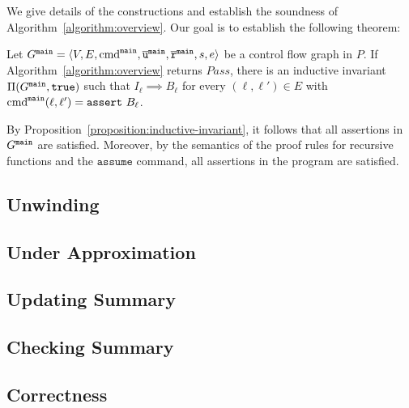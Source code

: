 
We give details of the constructions and establish the soundness of
Algorithm~\ref{algorithm:overview}. Our goal is to establish the
following theorem:

\begin{theorem}
  Let $G^{\mathtt{{main}}} = \langle V, E, \textmd{cmd}^{\mathtt{{main}}} , \overline{\mathtt{u}}^{\mathtt{{main}}}, \overline{\mathtt{r}}^{\mathtt{{main}}},s,e \rangle$ be a control flow
  graph in $P$. If Algorithm~\ref{algorithm:overview} returns
  $\mathit{Pass}$, there is an inductive invariant $\Pi (G^{\mathtt{{main}}}, \mathtt{true})$
  such that $I_{\ell} \implies B_{\ell}$ for every $(\ell, \ell') \in
  E$ with $\textmd{cmd}^{\mathtt{{main}}} (\ell, \ell') = \mathtt{assert\ } B_{\ell}$.
  \label{theorem:soundness}
\end{theorem}
By Proposition~\ref{proposition:inductive-invariant}, it follows that
all assertions in $G^{\mathtt{{main}}}$ are satisfied.
Moreover, by the semantics of the proof rules for recursive functions and the 
$\mathtt{assume}$ command, all assertions in the program are satisfied.



 
\subsection{Unwinding}
\label{subsection:unwinding}


\subsection{Under Approximation}
\label{subsection:under-approximation}


\subsection{Updating Summary}
\label{subsection:updating-summary}


\subsection{Checking Summary}
\label{subsection:checking-summary}


\subsection{Correctness}
\label{subsection:correctness}
